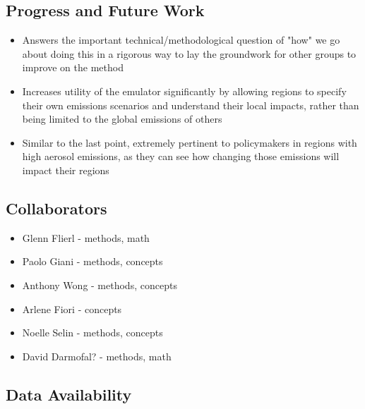 \subsection{Progress and Future Work}

\begin{itemize}
  \item Answers the important technical/methodological question of "how" we go about doing this in a rigorous way to lay the groundwork for other groups to improve on the method
  \item Increases utility of the emulator significantly by allowing regions to specify their own emissions scenarios and understand their local impacts, rather than being limited to the global emissions of others
  \item Similar to the last point, extremely pertinent to policymakers in regions with high aerosol emissions, as they can see how changing those emissions will impact their regions
\end{itemize}

\subsection{Collaborators}

\begin{itemize}
  \item Glenn Flierl - methods, math
  \item Paolo Giani - methods, concepts
  \item Anthony Wong - methods, concepts
  \item Arlene Fiori - concepts
  \item Noelle Selin - methods, concepts
  \item David Darmofal? - methods, math
\end{itemize}

\subsection{Data Availability}